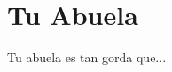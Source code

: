 \documentclass{article}  %
\begin{document}

\section{Tu Abuela}       %
Tu abuela es tan gorda que...  %
\end{document}

